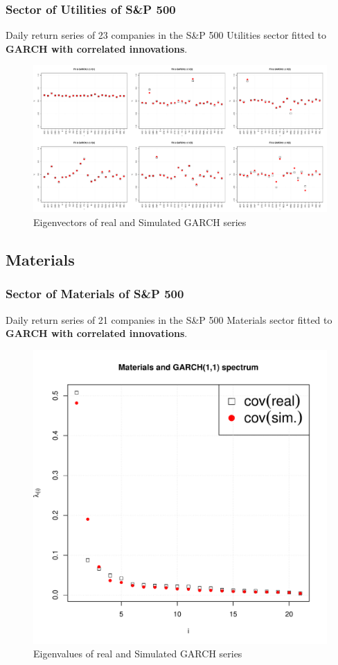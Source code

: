 \documentclass{beamer}
\begin{document}
\begin{frame}
  \frametitle{Sector of Utilities of S\&P 500}
  Daily return series of 23 companies in the S\&P 500 Utilities sector
  fitted to {\bf GARCH with correlated innovations}.
  \begin{figure}[htb!]
    \centering
    \includegraphics[width=1.0\linewidth]{Utilities_eigenvectors1.pdf}
    \caption{\scriptsize Eigenvectors of real and Simulated GARCH series}
  \end{figure}
\end{frame}

\subsection{Materials}
\begin{frame}
  \frametitle{Sector of Materials of S\&P 500}
  Daily return series of 21 companies in the S\&P 500 Materials sector
  fitted to {\bf GARCH with correlated innovations}.
  \begin{figure}[htb!]
    \centering
    \includegraphics[scale=0.35]{Materials_eigenvalues.pdf}
    \caption{\scriptsize Eigenvalues of real and Simulated GARCH series}
  \end{figure}
\end{frame}
\end{document}

